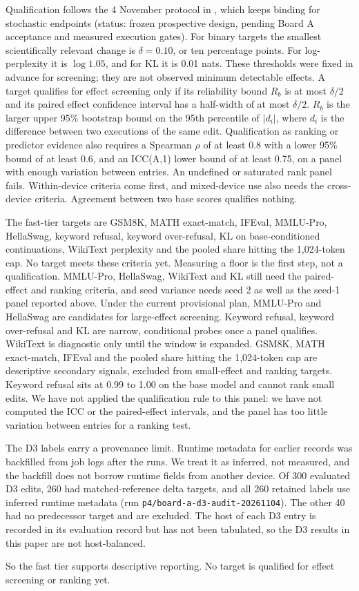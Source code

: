 Qualification follows the 4 November protocol in , which  keeps binding for stochastic endpoints (status: frozen prospective design, pending Board A acceptance and measured execution gates). For binary targets the smallest scientifically relevant change is $\delta = 0.10$, or ten percentage points. For log-perplexity it is $\log 1.05$, and for KL it is 0.01 nats. These thresholds were fixed in advance for screening; they are not observed minimum detectable effects. A target qualifies for effect screening only if its reliability bound $R_b$ is at most $\delta/2$ and its paired effect confidence interval has a half-width of at most $\delta/2$. $R_b$ is the larger upper 95\% bootstrap bound on the 95th percentile of $|d_i|$, where $d_i$ is the difference between two executions of the same edit. Qualification as ranking or predictor evidence also requires a Spearman $\rho$ of at least 0.8 with a lower 95\% bound of at least 0.6, and an ICC(A,1) lower bound of at least 0.75, on a panel with enough variation between entries. An undefined or saturated rank panel fails. Within-device criteria come first, and mixed-device use also needs the cross-device criteria. Agreement between two base scores qualifies nothing.

The fast-tier targets are GSM8K, MATH exact-match, IFEval, MMLU-Pro, HellaSwag, keyword refusal, keyword over-refusal, KL on base-conditioned continuations, WikiText perplexity and the pooled share hitting the 1,024-token cap. No target meets these criteria yet. Measuring a floor is the first step, not a qualification. MMLU-Pro, HellaSwag, WikiText and KL still need the paired-effect and ranking criteria, and seed variance needs seed 2 as well as the seed-1 panel reported above. Under the current provisional plan, MMLU-Pro and HellaSwag are candidates for large-effect screening. Keyword refusal, keyword over-refusal and KL are narrow, conditional probes once a panel qualifies. WikiText is diagnostic only until the window is expanded. GSM8K, MATH exact-match, IFEval and the pooled share hitting the 1,024-token cap are descriptive secondary signals, excluded from small-effect and ranking targets. Keyword refusal sits at 0.99 to 1.00 on the base model and cannot rank small edits. We have not applied the qualification rule to this panel: we have not computed the ICC or the paired-effect intervals, and the panel has too little variation between entries for a ranking test.

The D3 labels carry a provenance limit. Runtime metadata for earlier records was backfilled from job logs after the runs. We treat it as inferred, not measured, and the backfill does not borrow runtime fields from another device. Of 300 evaluated D3 edits, 260 had matched-reference delta targets, and all 260 retained labels use inferred runtime metadata (run \texttt{p4/board-a-d3-audit-20261104}). The other 40 had no predecessor target and are excluded. The host of each D3 entry is recorded in its evaluation record but has not been tabulated, so the D3 results in this paper are not host-balanced.

So the fast tier supports descriptive reporting. No target is qualified for effect screening or ranking yet.

\fussy

